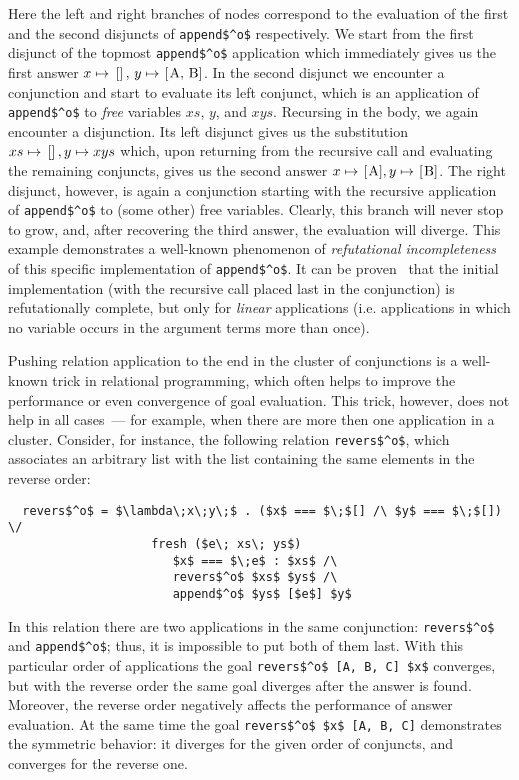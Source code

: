 Here the left and right branches of nodes correspond to the evaluation of the first and the second disjuncts of \lstinline|append$^o$| respectively. We start from
the first disjunct of the topmost \lstinline|append$^o$| application which immediately gives us the first answer $x\mapsto\mbox{\lstinline|[]|},\,y\mapsto\mbox{\lstinline|[A, B]|}$.
In the second disjunct we encounter a conjunction and start to evaluate its left conjunct, which is an application of \lstinline|append$^o$| to \emph{free} variables
$xs$, $y$, and $xys$. Recursing in the body, we again encounter a disjunction. Its left disjunct gives us the substitution $xs\mapsto\mbox{\lstinline|[]|},y\mapsto xys$ which, upon 
returning from the recursive call and evaluating the remaining conjuncts, gives us the second answer $x\mapsto\mbox{\lstinline|[A]|},y\mapsto\mbox{\lstinline|[B]|}$. The right
disjunct, however, is again a conjunction starting with the recursive application of \lstinline|append$^o$| to (some other) free variables. Clearly, this branch will never stop to
grow, and, after recovering the third answer, the evaluation will diverge. This example demonstrates a well-known phenomenon of \emph{refutational incompleteness}~\cite{fair:WillThesis}
of this specific implementation of \lstinline|append$^o$|. It can be proven~\cite{fair:semantics} that the initial implementation (with the recursive call placed last in the conjunction)
is refutationally complete, but only for \emph{linear} applications (i.e. applications in which no variable occurs in the argument terms more than once).

Pushing relation application to the end in the cluster of conjunctions is a well-known trick in relational programming, which often helps to improve the performance or even
convergence of goal evaluation. This trick, however, does not help in all cases~--- for example, when there are more then one application in a cluster. Consider, for instance, the
following relation \lstinline{revers$^o$}, which associates an arbitrary list with the list containing the same elements in the reverse order:

\begin{lstlisting}
  revers$^o$ = $\lambda\;x\;y\;$ . ($x$ === $\;$[] /\ $y$ === $\;$[]) \/
                    fresh ($e\; xs\; ys$) 
                       $x$ === $\;e$ : $xs$ /\ 
                       revers$^o$ $xs$ $ys$ /\
                       append$^o$ $ys$ [$e$] $y$
\end{lstlisting}

In this relation there are two applications in the same conjunction: \lstinline{revers$^o$} and \lstinline{append$^o$}; thus, it is impossible to put both of them last. With this particular
order of applications the goal \lstinline|revers$^o$ [A, B, C] $x$| converges, but with the reverse order the same goal diverges after the answer is found. Moreover, the reverse order negatively
affects the performance of answer evaluation. At the same time the goal \lstinline|revers$^o$ $x$ [A, B, C]| demonstrates the symmetric behavior: it diverges for the given order of conjuncts,
and converges for the reverse one.

